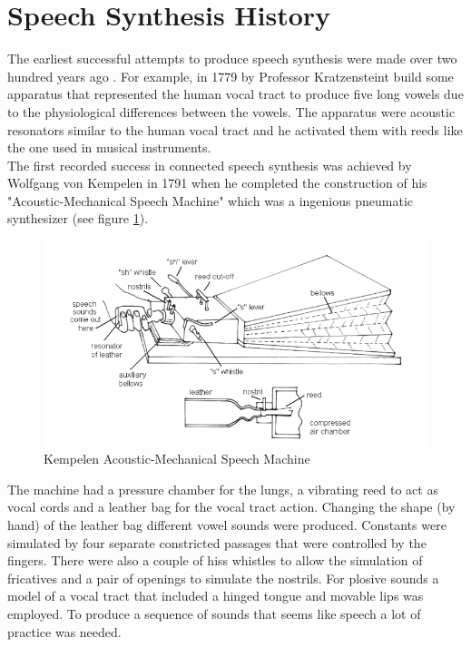 \section{Speech Synthesis History}\label{ssh}
The earliest successful attempts to produce speech synthesis were made over two hundred years ago \cite{flanagan}. For example, in 1779 by Professor Kratzensteint build some apparatus that represented the human vocal tract to produce five long vowels due to the physiological differences between the vowels. The apparatus were acoustic resonators similar to the human vocal tract and he activated them with reeds like the one used in musical instruments.\\
The first recorded success in connected speech synthesis was achieved by  Wolfgang von Kempelen in 1791 when he completed the construction of his "Acoustic-Mechanical Speech Machine" which was a ingenious pneumatic synthesizer (see figure \ref{kempelen}).
\begin{figure}[htb]
	\begin{center}
	\includegraphics[width=1\textwidth]{img/kempelen.png}
	\end{center}
	\caption{\label{kempelen}Kempelen Acoustic-Mechanical Speech Machine \cite{history-images}}
\end{figure}
The machine had a pressure chamber for the lungs, a vibrating reed to act as vocal cords and a leather bag for the vocal tract action. Changing the shape (by hand) of the leather bag different vowel sounds were produced. Constants were simulated by four separate constricted passages that were controlled by the fingers. There were also a couple of hiss whistles to allow the simulation of fricatives and a pair of openings to simulate the nostrils. For plosive sounds a model of a vocal tract that included a hinged tongue and movable lips was employed. To produce a sequence of sounds that seems like speech a lot of practice was needed.\\
